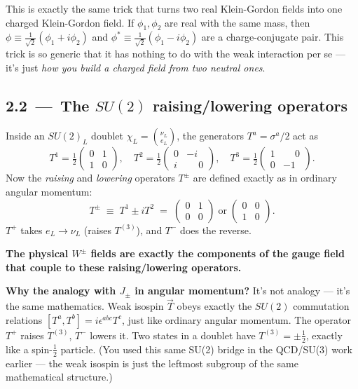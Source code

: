 \documentclass[11pt]{article}
\begin{document}
\begin{intuitionbox}
This is exactly the same trick that turns two real Klein-Gordon fields into one charged
Klein-Gordon field. If $\phi_1, \phi_2$ are real with the same mass, then
$\phi \equiv \tfrac{1}{\sqrt2}(\phi_1 + i\phi_2)$ and $\phi^* \equiv \tfrac{1}{\sqrt2}(\phi_1 - i\phi_2)$
are a charge-conjugate pair. This trick is so generic that it has nothing to do with the
weak interaction per se --- it's just \emph{how you build a charged field from two neutral
ones}.
\end{intuitionbox}

\subsection*{2.2 \,---\, The $SU(2)$ raising/lowering operators}

\begin{stepbox}[title=Step 2.2: Look at how $W^1$ and $W^2$ act inside the doublet]
Inside an $SU(2)_L$ doublet $\chi_L = \binom{\nu_L}{e_L}$, the generators $T^a = \sigma^a/2$
act as
\[
T^1 = \tfrac{1}{2}\!\begin{pmatrix} 0 & 1 \\ 1 & 0 \end{pmatrix},
\quad
T^2 = \tfrac{1}{2}\!\begin{pmatrix} 0 & -i \\ i & \phantom{-}0 \end{pmatrix},
\quad
T^3 = \tfrac{1}{2}\!\begin{pmatrix} 1 & \phantom{-}0 \\ 0 & -1 \end{pmatrix}.
\]
Now the \emph{raising} and \emph{lowering} operators $T^\pm$ are defined exactly as in
ordinary angular momentum:
\[
T^\pm \;\equiv\; T^1 \pm i T^2 \;=\; \begin{pmatrix} 0 & 1 \\ 0 & 0 \end{pmatrix} \;\text{or}\; \begin{pmatrix} 0 & 0 \\ 1 & 0 \end{pmatrix}.
\]
$T^+$ takes $e_L \to \nu_L$ (raises $T^{(3)}$), and $T^-$ does the reverse.

\textbf{The physical $W^\pm$ fields are exactly the components of the gauge field that
couple to these raising/lowering operators.}
\end{stepbox}

\begin{termbox}
\textbf{Why the analogy with $J_\pm$ in angular momentum?} It's not analogy --- it's the same
mathematics. Weak isospin $\vec{T}$ obeys exactly the $SU(2)$ commutation relations
$[T^a, T^b] = i\epsilon^{abc} T^c$, just like ordinary angular momentum. The operator
$T^+$ raises $T^{(3)}$, $T^-$ lowers it. Two states in a doublet have $T^{(3)} = \pm \tfrac{1}{2}$,
exactly like a spin-$\tfrac{1}{2}$ particle. (You used this same SU(2) bridge in the
QCD/SU(3) work earlier --- the weak isospin is just the leftmost subgroup of the same
mathematical structure.)
\end{termbox}
\end{document}
